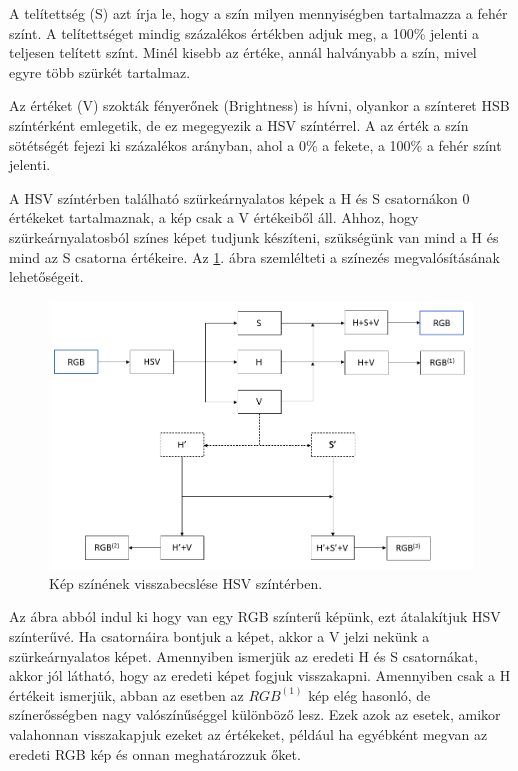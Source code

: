A telítettség (S) azt írja le, hogy a szín milyen mennyiségben tartalmazza a fehér színt. A telítettséget mindig százalékos értékben adjuk meg, a 100\% jelenti a teljesen telített színt. Minél kisebb az értéke, annál halványabb a szín, mivel egyre több szürkét tartalmaz.

Az értéket (V) szokták fényerőnek (Brightness) is hívni, olyankor a színteret HSB színtérként emlegetik, de ez megegyezik a HSV színtérrel. A az érték a szín sötétségét fejezi ki százalékos arányban, ahol a 0\% a fekete, a 100\% a fehér színt jelenti. \cite{colorspaces}

A HSV színtérben található szürkeárnyalatos képek a H és S csatornákon 0 értékeket tartalmaznak, a kép csak a V értékeiből áll. Ahhoz, hogy szürkeárnyalatosból színes képet tudjunk készíteni, szükségünk van mind a H és mind az S csatorna értékeire. Az \ref{fig:hsv_colorization}. ábra szemlélteti a színezés megvalósításának lehetőségeit.

\begin{figure}[h]
\centering
\includegraphics[scale=0.5]{images/hsv_colorization.png}
\caption{Kép színének visszabecslése HSV színtérben.}
\label{fig:hsv_colorization}
\end{figure}

Az ábra abból indul ki hogy van egy RGB színterű képünk, ezt átalakítjuk HSV színterűvé. Ha csatornáira bontjuk a képet, akkor a V  jelzi nekünk a szürkeárnyalatos képet. Amennyiben ismerjük az eredeti H és S csatornákat, akkor jól látható, hogy az eredeti képet fogjuk visszakapni. Amennyiben csak a H értékeit ismerjük, abban az esetben az $RGB^{(1)}$ kép elég hasonló, de színerősségben nagy valószínűséggel különböző lesz. Ezek azok az esetek, amikor valahonnan visszakapjuk ezeket az értékeket, például ha egyébként megvan az eredeti RGB kép és onnan meghatározzuk őket.

